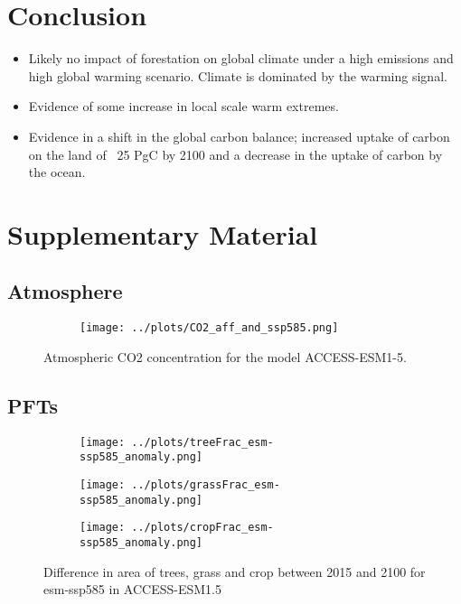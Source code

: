 \documentclass[]{article}
\begin{document}
\section{Conclusion}

\begin{itemize}
    \item Likely no impact of forestation on global climate under a high emissions and high global warming scenario. Climate is dominated by the warming signal.
    \item Evidence of some increase in local scale warm extremes.
    \item Evidence in a shift in the global carbon balance; increased uptake of carbon on the land of ~25 PgC by 2100 and a decrease in the uptake of carbon by the ocean.
\end{itemize}

\printbibliography

\section{Supplementary Material}
\setcounter{figure}{0}

\subsection{Atmosphere}
\begin{figure}[H]
    \centering
    \begin{subfigure}[b]{0.4\linewidth}
        \texttt{[image: ../plots/CO2\_aff\_and\_ssp585.png]}
    \end{subfigure}
    \caption{Atmospheric CO2 concentration for the model ACCESS-ESM1-5.}
    \label{fig:ACCESS_CO2_conc}
\end{figure}

\subsection{PFTs}

\begin{figure}[H]
    \centering
    \begin{subfigure}[b]{0.4\linewidth}
        \texttt{[image: ../plots/treeFrac\_esm-ssp585\_anomaly.png]}
    \end{subfigure}
    \begin{subfigure}[b]{0.4\linewidth}
        \texttt{[image: ../plots/grassFrac\_esm-ssp585\_anomaly.png]}
    \end{subfigure}
    \begin{subfigure}[b]{0.4\linewidth}
        \texttt{[image: ../plots/cropFrac\_esm-ssp585\_anomaly.png]}
    \end{subfigure}
    \caption{Difference in area of trees, grass and crop between 2015 and 2100 for esm-ssp585 in ACCESS-ESM1.5}
    \label{fig:ACCESS_land_cover}
\end{figure}
\end{document}
